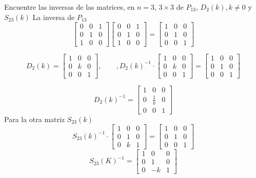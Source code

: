 \documentclass[
]{article}
\begin{document}
Encuentre las inversas de las matrices, en \(n=3\), \(3\times 3\) de
\(P_{13}\), \(D_2(k), k\ne 0\) y \(S_{23}(k)\) La inversa de \(P_{13}\)
\[
\begin{bmatrix}
      0 & 0 & 1 \\
      0 & 1 & 0 \\
      1 & 0 & 0
  \end{bmatrix}
\begin{bmatrix}
      0 & 0 & 1 \\
      0 & 1 & 0 \\
      1 & 0 & 0
  \end{bmatrix} = 
\begin{bmatrix}
      1 & 0 & 0 \\
      0 & 1 & 0 \\
      0 & 0 & 1
  \end{bmatrix}
\]

\[
D_2(k)=\begin{bmatrix}
              1 & 0 & 0 \\
              0 & k & 0 \\
              0 & 0 & 1
        \end{bmatrix},\quad\quad, D_2(k)^{-1}\cdot \begin{bmatrix}
              1 & 0 & 0 \\
              0 & k & 0 \\
              0 & 0 & 1
        \end{bmatrix} =
        \begin{bmatrix}
            1 & 0 & 0 \\
            0 & 1 & 0 \\
            0 & 0 & 1
      \end{bmatrix}
\]

\[
D_2(k)^{-1}=\begin{bmatrix}
              1 & 0 & 0 \\
              0 & \frac{1}{k} & 0 \\
              0 & 0 & 1
        \end{bmatrix}
\] Para la otra matriz \(S_{23}(k)\) \[
S_{23}(k)^{-1} \cdot  \begin{bmatrix}
                            1 & 0 & 0 \\
                            0 & 1 & 0 \\
                            0 & k & 1
                      \end{bmatrix} = 
                      \begin{bmatrix}
                            1 & 0 & 0 \\
                            0 & 1 & 0 \\
                            0 & 0 & 1
                      \end{bmatrix}
\] \[
  S_{23}(K)^{-1}=\begin{bmatrix}
                        1 & 0 & 0 \\
                        0 & 1 & 0 \\
                        0 & -k & 1
                  \end{bmatrix}
\]
\end{document}
